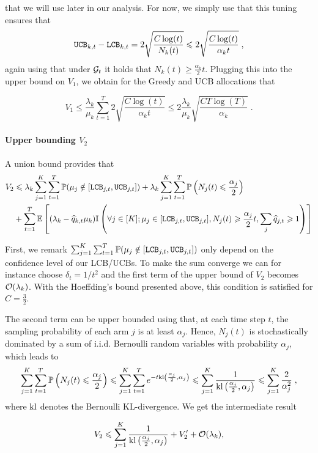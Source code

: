 that we will use later in our analysis. For now, we simply use that this tuning ensures that \[\texttt{UCB}_{k,t}-\texttt{LCB}_{k, t} = 2\sqrt{\frac{C\log(t)}{N_k(t)}} \leqslant 2\sqrt{\frac{C\log(t)}{\alpha_k t}} \;, \]
again using that under $\mathcal{G}_t$ it holds that $N_k(t)\geq \frac{\alpha_k}{2}t$. Plugging this into the upper bound on $V_1$, we obtain for the Greedy and UCB allocations that 

\[V_1 \leq \frac{\lambda_k}{\mu_k} \sum_{t=1}^T 2 \sqrt{\frac{C\log(t)}{\alpha_k t}} \leq 2\frac{\lambda_k}{\mu_k}\sqrt{\frac{CT\log(T)}{\alpha_k}}\;. \] 

\paragraph{Upper bounding $V_2$} A union bound provides that 
\begin{align*}
V_2 & \leqslant \lambda_k \sum_{j=1}^K \sum_{t=1}^T \mathbb{P}(\mu_j \notin [\texttt{LCB}_{j, t}, \texttt{UCB}_{j, t}])  + \lambda_k \sum_{j=1}^K \sum_{t=1}^T\mathbb{P}\left(N_j(t)\leqslant \frac{\alpha_j}{2}\right) \\
&+ \sum_{t=1}^T \mathbb{E}\left[(\lambda_k - \widehat{q}_{k,t}\mu_k)\mathbb{I}\left(\forall j \in [K]; \mu_j \in [\texttt{LCB}_{j, t}, \texttt{UCB}_{j, t}], N_j(t)\geqslant \frac{\alpha_j}{2}t,  \sum_j \widehat{q}_{j,t} \geqslant 1\right)\right] 
\end{align*}
 
First, we remark $\sum_{j=1}^K \sum_{t=1}^T \mathbb{P}(\mu_j \notin [\texttt{LCB}_{j, t}, \texttt{UCB}_{j, t}])$ only depend on the confidence level of our LCB/UCBs. To make the sum converge we can for instance choose $\delta_t = 1/t^2$ and the first term of the upper bound of $V_2$ becomes $\mathcal{O}(\lambda_k)$. With the Hoeffding's bound presented above, this condition is satisfied for $C=\frac{3}{2}$.

The second term can be upper bounded using that, at each time step $t$, the sampling probability of each arm $j$ is at least $\alpha_j$. Hence, $N_j(t)$ is stochastically dominated by a sum of i.i.d. Bernoulli random variables with probability $\alpha_j$, which leads to 
\begin{align*}
\sum_{j=1}^K \sum_{t=1}^T\mathbb{P}\left(N_j(t)\leqslant \frac{\alpha_j}{2}\right) \leqslant \sum_{j=1}^K \sum_{t=1}^T e^{-t \text{\normalfont kl}\left(\frac{\alpha_j}{2}, \alpha_j\right)} \leqslant  \sum_{j=1}^K   \frac{1}{\text{\normalfont kl}\left(\frac{\alpha_j}{2}, \alpha_j\right)} \leqslant \sum_{j=1}^K\frac{2}{\alpha_j^2}\;,
\end{align*}
where $\text{\normalfont kl}$ denotes the Bernoulli KL-divergence. We get the intermediate result 

\[V_2 \leqslant \sum_{j=1}^K   \frac{1}{\text{\normalfont kl}\left(\frac{\alpha_j}{2}, \alpha_j\right)} + V_2'+ \mathcal{O}(\lambda_k),  \]

